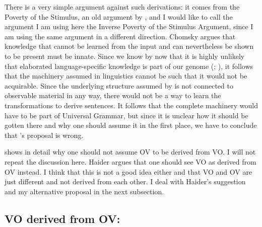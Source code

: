 \noindent
There is a very simple argument against such derivations: it comes from the Poverty of the
Stimulus, an old argument by \citet[]{Chomsky80b-u}, and I would like to call the argument I
am using here the Inverse Poverty of the Stimulus Argument, since I am using the same argument in a
different direction. Chomsky argues that knowledge that cannot be learned from the
input and can nevertheless be shown to be present must be innate. Since we know by now that it is
highly unlikely that elaborated language-specific knowledge is part of our genome
(\citealt*{HCF2002a}; \cites{Bishop2002a}[Section~6.4.2.2]{Dabrowska2004a}{FM2005a}), it follows that
the machinery assumed in linguistics cannot be such that it would not be acquirable. Since the
underlying structure assumed by \citeauthor{Laenzlinger2004a} is not connected to observable
material in any way, there would not be a way to learn the transformations to derive 
sentences. It follows that the complete machinery would have to be part of Universal Grammar, but
since it is unclear how it should be gotten there and why one should assume it in the first place,
we have to conclude that \citeauthor{Kayne94a-u}'s proposal is wrong.

\largerpage[1.1]
\citet{Haider2000a} shows in detail why one should not assume OV to be derived from VO. I will not
repeat the discussion here. Haider argues that one should see VO as derived from OV instead. I think
that this is not a good idea either and that VO and OV are just different and not derived from
each other. I deal with Haider's suggestion and my alternative proposal in the next subsection.



\subsection{VO derived from OV: \citet{Haider2020a}}
\label{sec-vo-derived-from-ov}


